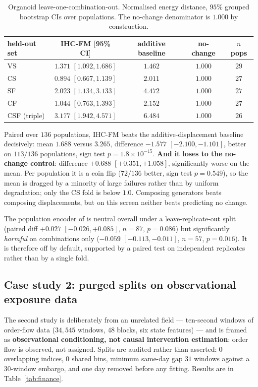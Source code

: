 \documentclass{article}
\begin{document}
\begin{table}[t]
\centering
\caption{Organoid leave-one-combination-out. Normalised energy distance, $95\%$ grouped
bootstrap CIs over populations. The no-change denominator is $1.000$ by construction.}
\label{tab:loco}
\begin{tabular}{lcccc}
\toprule
held-out set & IHC-FM [95\% CI] & additive baseline & no-change & $n$ pops \\
\midrule
VS  & $1.371$ $[1.092, 1.686]$ & $1.462$ & $1.000$ & $29$ \\
CS  & $\mathbf{0.894}$ $[0.667, 1.139]$ & $2.011$ & $1.000$ & $27$ \\
SF  & $2.023$ $[1.134, 3.133]$ & $4.472$ & $1.000$ & $27$ \\
CF  & $1.044$ $[0.763, 1.393]$ & $2.152$ & $1.000$ & $27$ \\
CSF (triple) & $3.177$ $[1.942, 4.571]$ & $6.484$ & $1.000$ & $26$ \\
\bottomrule
\end{tabular}
\end{table}

Paired over $136$ populations, IHC-FM beats the additive-displacement baseline decisively:
mean $1.688$ versus $3.265$, difference $\mathbf{-1.577}$ $[-2.100, -1.101]$, better on
$113/136$ populations, sign test $p = 1.8\times10^{-15}$. \textbf{And it loses to the
no-change control}: difference $+0.688$ $[+0.351, +1.058]$, significantly worse on the mean.
Per population it is a coin flip ($72/136$ better, sign test $p = 0.549$), so the mean is
dragged by a minority of large failures rather than by uniform degradation; only the CS fold
is below $1.0$. Composing generators beats composing displacements, but on this screen
neither beats predicting no change.

The population encoder of \citet{atanackovic2024mfm} is neutral overall under a
leave-replicate-out split (paired diff $+0.027$ $[-0.026, +0.085]$, $n{=}87$, $p = 0.086$)
but significantly \emph{harmful} on combinations only ($-0.059$ $[-0.113, -0.011]$, $n{=}57$,
$p = 0.016$). It is therefore off by default, supported by a paired test on independent
replicates rather than by a single fold.

\subsection{Case study 2: purged splits on observational exposure data}

The second study is deliberately from an unrelated field --- ten-second windows of
order-flow data ($34{,}545$ windows, $48$ blocks, six state features) --- and is framed as
\textbf{observational conditioning, not causal intervention estimation}: order flow is
observed, not assigned. Splits are audited rather than asserted: $0$ overlapping indices, $0$
shared bins, minimum same-day gap $31$ windows against a $30$-window embargo, and one day
removed before any fitting. Results are in Table~\ref{tab:finance}.
\end{document}
